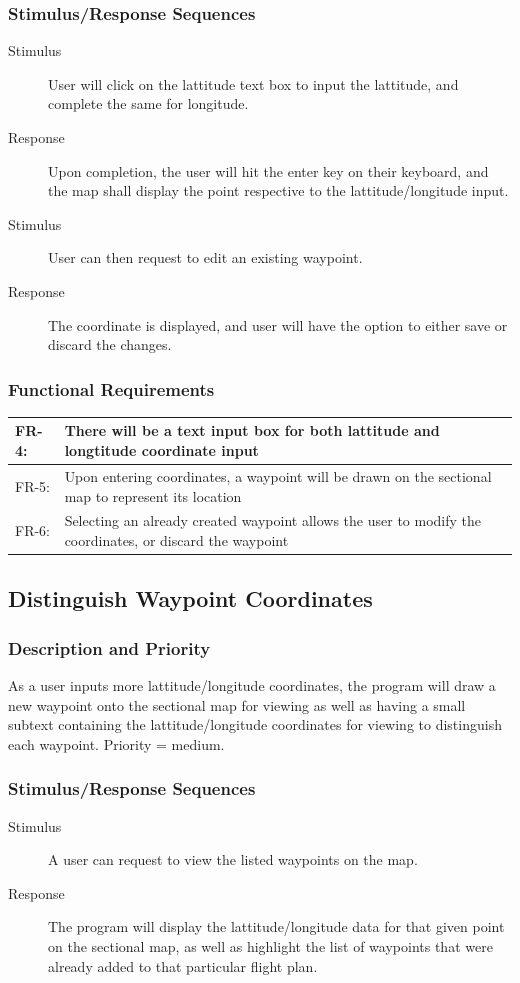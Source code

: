 \documentclass[12pt, letterpaper]{article}
\begin{document}
    \subsubsection{Stimulus/Response Sequences}
      \begin{description}
        \item[Stimulus] User will click on the lattitude text box to input the 
			lattitude, and complete the same for longitude.
		\item[Response] Upon completion, the user will hit the enter key on their
			keyboard, and the map shall display the point respective
			to the lattitude/longitude input.
		\item[Stimulus] User can then request to edit an existing waypoint.
		\item[Response] The coordinate is displayed, and user will have the option to
			either save or discard the changes.
      \end{description}
    \subsubsection{Functional Requirements}
    \begin{tabularx}{\textwidth}{|l|X|} \hline
      FR-4: & There will be a text input box for both lattitude and longtitude coordinate input\\ \hline
      FR-5: & Upon entering coordinates, a waypoint will be drawn on the sectional map to represent its location\\ \hline
      FR-6: & Selecting an already created waypoint allows the user to modify the coordinates, or discard the waypoint\\ \hline
      \end{tabularx} 

    \subsection{Distinguish Waypoint Coordinates}
      \subsubsection{Description and Priority}
		As a user inputs more lattitude/longitude coordinates, the program will
	    draw a new waypoint onto the sectional map for viewing as well 
		as having a small subtext containing the lattitude/longitude coordinates 
		for viewing to distinguish each waypoint. Priority = medium.
      \subsubsection{Stimulus/Response Sequences}
        \begin{description}
          \item[Stimulus] A user can request to view the listed waypoints on the map.
		  \item[Response] The program will display the lattitude/longitude data
			for that given point on the sectional map, as well as highlight the
			list of waypoints that were already added to that particular flight
			plan.
        \end{description}
\end{document}
